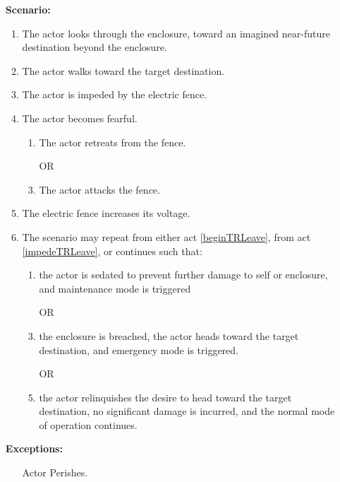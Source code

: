 \documentclass[12pt]{article}
\begin{document}
\begin{itemize}
        \item[]\textbf{Scenario:}                    
            \begin{enumerate}
                \item The actor looks through the enclosure, 
                toward an imagined near-future destination beyond
                the enclosure. \label{beginTRLeave}
                \item The actor walks toward the target destination.
                \item The actor is impeded by the electric fence. \label{impedeTRLeave}
                \item The actor becomes fearful.
                \begin{enumerate}
                    \item The actor retreats from the fence.
                    \item[OR]
                    \item The actor attacks the fence. 
                \end{enumerate}
                \item The electric fence increases its voltage.
                \item The scenario may repeat from either 
                act \ref{beginTRLeave}, from act \ref{impedeTRLeave}, 
                or continues such that:
                \begin{enumerate}
                    \item the actor is sedated to prevent further damage
                    to self or enclosure, and maintenance mode is triggered
                    \item[OR]
                    \item the enclosure is breached, the actor 
                    heads toward the target destination, and emergency
                    mode is triggered.
                    \item[OR]
                    \item the actor relinquishes the desire to head
                    toward the target destination, no significant damage
                    is incurred, and the normal mode of operation continues.
                    \end{enumerate} 
            \end{enumerate}

        \item[]\textbf{Exceptions:}
            \begin{itemize}
                \item[] Actor Perishes.
            \end{itemize}


\end{itemize}
\end{document}
